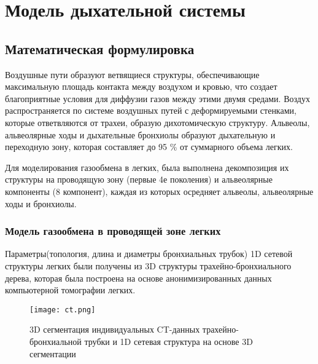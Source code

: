 \chapter{Модель дыхательной системы }
\label{chapter:lungs}
\section{Математическая формулировка}
Воздушные пути образуют ветвящиеся структуры, обеспечивающие максимальную площадь контакта между воздухом и кровью, что создает благоприятные условия для диффузии газов между этими двумя средами. Воздух распространяется по системе воздушных путей с деформируемыми стенками, которые ответвляются от трахеи, образую дихотомическую структуру. Альвеолы, альвеолярные ходы и дыхательные бронхиолы образуют дыхательную и переходную зону, которая составляет до 95 \% от суммарного объема легких.

Для моделирования газообмена в легких, была выполнена декомпозиция их структуры на проводящую зону (первые 4е поколения) и альвеолярные компоненты (8 компонент), каждая из которых осредняет альвеолы, альвеолярные ходы и бронхиолы. 
\subsection{Модель газообмена в проводящей зоне легких}
\label{sec:1dLung}
Параметры(топология, длина и диаметры бронхиальных трубок) 1D сетевой структуры легких были получены из 3D структуры трахейно-бронхиального дерева, которая была построена на основе анонимизированных данных компьютерной томографии легких.    

\begin{figure}[!ht]
	\centering
	\texttt{[image: ct.png]}
	\caption{3D сегментация индивидуальных CT-данных трахейно-бронхиальной трубки и 1D сетевая структура на основе 3D сегментации} 
	\label{s2vechart}
\end{figure}


